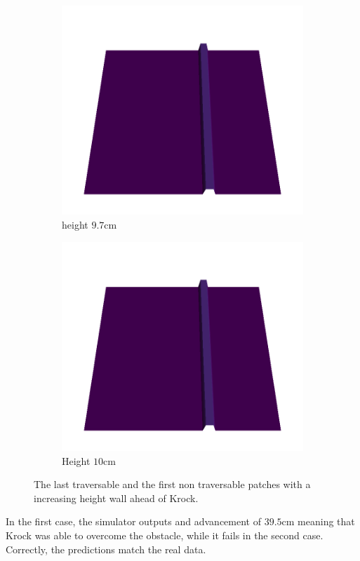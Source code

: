 \documentclass[../document.tex]{subfiles}
\begin{document}
\begin{figure}[H]
\begin{subfigure}[b]{0.33\textwidth}
    \end{subfigure}   
    \begin{subfigure}[b]{0.33\textwidth}
        \includegraphics[width=\linewidth]{../img/5/custom_patches/walls_increasing/wall-height-1-3d.png}
    \caption{height $9.7$cm}
    \end{subfigure}   
    \begin{subfigure}[b]{0.33\textwidth}
        \includegraphics[width=\linewidth]{../img/5/custom_patches/walls_increasing/wall-height-2-3d}
        \caption{Height $10$cm}
    \end{subfigure}   
\caption{The last traversable and the first non traversable patches   with a increasing height wall ahead of Krock.}    
\end{figure}
In the first case, the simulator outputs and advancement of $39.5$cm meaning that Krock was able to overcome the obstacle, while it fails in the second case. Correctly, the predictions match the real data.
\end{document}
